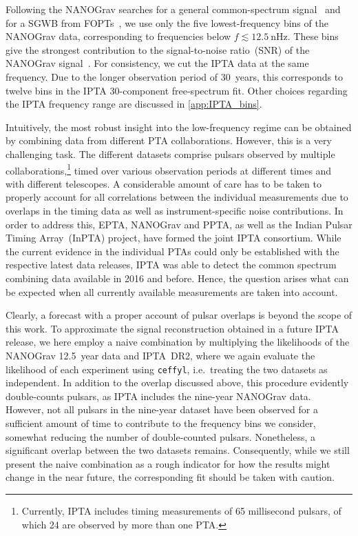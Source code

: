 \documentclass{article}
\begin{document}
Following the NANOGrav searches for a general common-spectrum signal~\cite{NANOGrav:2020bcs} and for a SGWB from FOPTs~\cite{NANOGrav:2021flc}, we use only the five lowest-frequency bins of the NANOGrav data, corresponding to frequencies below $f \lesssim \SI{12.5}{\nano\Hz}$.
These bins give the strongest contribution to the signal-to-noise ratio~(SNR) of the NANOGrav signal~\cite{NANOGrav:2020bcs}.
For consistency, we cut the IPTA data at the same frequency.
Due to the longer observation period of 30~years, this corresponds to twelve bins in the IPTA 30-component free-spectrum fit.
Other choices regarding the IPTA frequency range are discussed in \cref{app:IPTA_bins}.

Intuitively, the most robust insight into the low-frequency regime can be obtained by combining data from different PTA collaborations.
However, this is a very challenging task.
The different datasets comprise pulsars observed by multiple collaborations,\footnote{%
    Currently, IPTA includes timing measurements of 65 millisecond pulsars, of which 24 are observed by more than one PTA.
} 
timed over various observation periods at different times and with different telescopes.
A considerable amount of care has to be taken to properly account for all correlations between the individual measurements due to overlaps in the timing data as well as instrument-specific noise contributions. 
In order to address this, EPTA, NANOGrav and PPTA, as well as the Indian Pulsar Timing Array~(InPTA) project, have formed the joint IPTA consortium.
While the current evidence in the individual PTAs could only be established with the respective latest data releases, IPTA was able to detect the common spectrum combining data available in 2016 and before.
Hence, the question arises what can be expected when all currently available measurements are taken into account.

Clearly, a forecast with a proper account of pulsar overlaps is beyond the scope of this work.
To approximate the signal reconstruction obtained in a future IPTA release, we here employ a naive combination by multiplying the likelihoods of the NANOGrav 12.5~year data and IPTA~DR2, where we again evaluate the likelihood of each experiment using \texttt{ceffyl}, i.e.\ treating the two datasets as independent.
In addition to the overlap discussed above, this procedure evidently double-counts pulsars, as IPTA includes the nine-year NANOGrav data.
However, not all pulsars in the nine-year dataset have been observed for a sufficient amount of time to contribute to the frequency bins we consider, somewhat reducing the number of double-counted pulsars.
Nonetheless, a significant overlap between the two datasets remains. 
Consequently, while we still present the naive combination as a rough indicator for how the results might change in the near future, the corresponding fit should be taken with caution.
\end{document}
